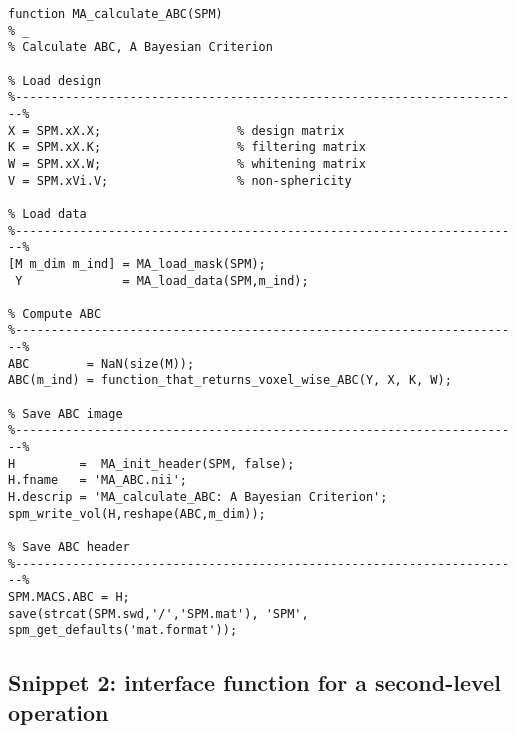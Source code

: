 \documentclass[a4paper,12pt]{article}
\begin{document}
\vspace{1em}
\begin{verbatim}
function MA_calculate_ABC(SPM)
% _
% Calculate ABC, A Bayesian Criterion

% Load design
%-----------------------------------------------------------------------%
X = SPM.xX.X;                   % design matrix
K = SPM.xX.K;                   % filtering matrix
W = SPM.xX.W;                   % whitening matrix
V = SPM.xVi.V;                  % non-sphericity

% Load data
%-----------------------------------------------------------------------%
[M m_dim m_ind] = MA_load_mask(SPM);
 Y              = MA_load_data(SPM,m_ind);

% Compute ABC
%-----------------------------------------------------------------------%
ABC        = NaN(size(M));
ABC(m_ind) = function_that_returns_voxel_wise_ABC(Y, X, K, W);

% Save ABC image
%-----------------------------------------------------------------------%
H         =  MA_init_header(SPM, false);
H.fname   = 'MA_ABC.nii';
H.descrip = 'MA_calculate_ABC: A Bayesian Criterion';
spm_write_vol(H,reshape(ABC,m_dim));

% Save ABC header
%-----------------------------------------------------------------------%
SPM.MACS.ABC = H;
save(strcat(SPM.swd,'/','SPM.mat'), 'SPM', spm_get_defaults('mat.format'));
\end{verbatim}


\pagebreak
\subsection*{Snippet 2: interface function for a second-level operation} \label{sec:DEF-inter}
\end{document}
